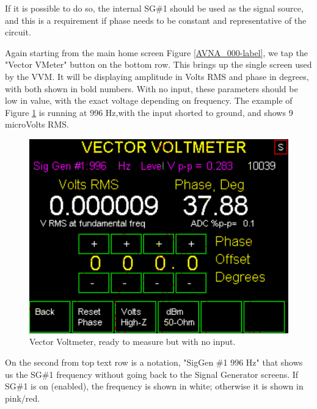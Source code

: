 If it is possible to do so, the internal SG\#1 should be used as the signal source, and this is a requirement if phase needs to be constant and representative of the circuit.

Again starting from the main home screen Figure \ref{AVNA_000-label}, we tap the "\textsf{Vector VMeter}" button on the bottom row.  This brings up the single screen used by the VVM.  It will be displaying amplitude in \textsf{Volts RMS}  and phase in degrees, with both shown in bold numbers.  With no input, these parameters should be low in value, with the exact voltage depending on frequency.  The example of Figure  \ref{AVNA_015-label} is running at 996 Hz,with the input shorted to ground, and shows 9 microVolts RMS.
%
\begin{figure}[H]
\begin{center}
\includegraphics[scale=0.75]{./images/AVNA_015.pdf}
\caption{Vector Voltmeter, ready to measure but with no input.}
\label{AVNA_015-label}
\end{center}
\end{figure}
%
On the second from top text row is a notation, "\textsf{SigGen \#1 996 Hz}" that shows us the SG\#1 frequency without going back to the Signal Generator screens.  If SG\#1 is on (enabled), the frequency is shown in white; otherwise it is shown in pink/red.


